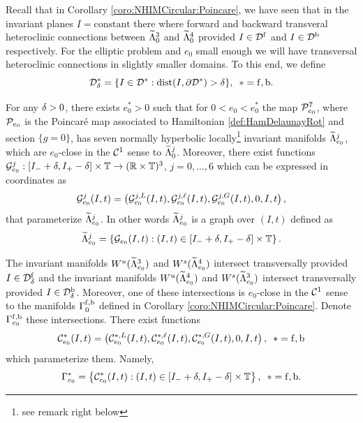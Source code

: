 Recall that in Corollary \ref{coro:NHIMCircular:Poincare}, we have seen that in the invariant planes $I=\text{constant}$ there where forward and backward transveral heteroclinic connections between $\widetilde \Lambda_0^3$ and $\widetilde \Lambda_0^4$ provided $I\in \mathcal{D}^{\mathrm{f}}$ and $I\in\mathcal{D}^{\mathrm{b}}$ respectively. For the elliptic problem and $e_0$ small enough we will have transversal heteroclinic connections in slightly smaller domains. To this end, we define
\begin{equation}
 \mathcal{D}_\delta^{\ast}=\{I\in \mathcal{D}^\ast: \mathrm{dist} (I,\partial\mathcal{D}^\ast)>\delta\},\,\,\,\ast=\mathrm{f},\mathrm{b}.
\end{equation}

\begin{theorem}\label{th:Elliptic:NHIM}
  For any $\delta>0$, there exists $e_0^\ast>0$ such that for $0<e_0<e_0^\ast$ the map $\mathcal{P}_{e_0}^7$, where $\mathcal{P}_{e_0}$ is the Poincar\'e map associated to
  Hamiltonian \eqref{def:HamDelaunayRot} and section $\{g=0\}$, has seven normally hyperbolic 
  locally\footnote{see remark right below} invariant manifolds $\widetilde\Lambda^j_{e_0}$, which are
  $e_0$-close in the $\mathcal{C}^1$ sense to $\widetilde\Lambda_0^j$.  Moreover, there exist
   functions
  $\mathcal{G}^j_{e_0}: [I_-+\delta,I_+-\delta]\times\mathbb{T}\rightarrow (\mathbb{R}\times\mathbb{T})^3$, $j=0,\ldots,6$ which can be
  expressed in coordinates as
  \begin{equation}\label{def:NHIM:Param:ell}
    \mathcal{G}^j_{e_0}(I,t)=\left(\mathcal{G}_{e_0}^{j,L}(I,t),\mathcal{G}_{e_0}^{j,\ell}(I,t), \mathcal{G}_{e_0}^{j,G}(I,t),0,I,t\right),
  \end{equation}
  that parameterize $\widetilde\Lambda^j_{e_0}$. In other words $\widetilde\Lambda^j_{e_0}$ is 
  a graph over $(I,t)$ defined as
  \[
  \widetilde\Lambda^j_{e_0}=\left\{ \mathcal{G}_{e_0}(I,t):(I,t)\in[I_-+\delta,I_+-\delta]\times \mathbb{T}\right\}.
  \]

  The invariant manifolds $W^{u}(\widetilde\Lambda_{e_0}^3)$ and $W^{s}(\widetilde\Lambda_{e_0}^4)$ intersect 
  transversally provided $I\in \mathcal{D}^{\mathrm{f}}_\delta$ and the invariant manifolds $W^{u}(\widetilde\Lambda_{e_0}^4)$ 
  and $W^{s}(\widetilde\Lambda_{e_0}^3)$ intersect transversally provided $I\in \mathcal{D}^{\mathrm{b}}_\delta$. 
  Moreover, one of these intersections is $e_0$-close in the $\mathcal{C}^1$ sense to 
  the manifolds $\Gamma^{\mathrm{f},\mathrm{b}}_0$ defined in Corollary \ref{coro:NHIMCircular:Poincare}. 
  Denote $\Gamma^{\mathrm{f},\mathrm{b}}_{e_0}$ these intersections. There exist functions
  \[
  \mathcal{C}^\ast_{e_0}(I,t)=\left(\mathcal{C}_{e_0}^{\ast,L}(I,t),\mathcal{C}_{e_0}^{\ast,\ell}(I,t), \mathcal{C}_{e_0}^{\ast,G}(I,t),0,I,t\right),\,\,\,\ast=\mathrm{f},\mathrm{b}
  \]
  which parameterize them. Namely,
  \[
  \Gamma^\ast_{e_0}=\left\{ \mathcal{C}^\ast_{e_0}(I,t):(I,t)\in[I_-+\delta,I_+-\delta]\times\mathbb{T}\right\},\,\,\,\ast=\mathrm{f},\mathrm{b}.
  \]
\end{theorem}


